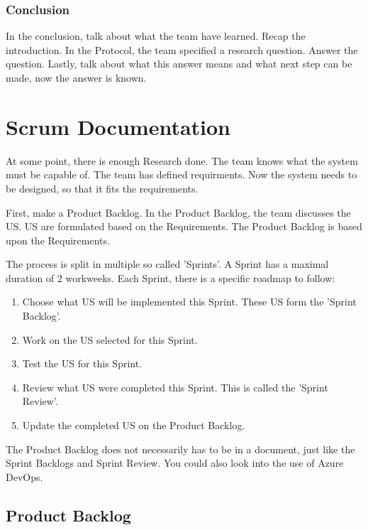 \documentclass[10pt]{report}
\begin{document}
\subsection{Conclusion}

In the conclusion, talk about what the team have learned. Recap the introduction. In the Protocol, the team specified a research question. Answer the question. Lastly, talk about what this answer means and what next step can be made, now the answer is known.

\newpage

\chapter{Scrum Documentation}
\thispagestyle{fancy}

At some point, there is enough Research done. The team knows what the system must be capable of. The team has defined requirments. Now the system needs to be designed, so that it fits the requirements.

\medskip
\minitoc
\medskip

\noindent First, make a Product Backlog. In the Product Backlog, the team discusses the US. US are formulated based on the Requirements. The Product Backlog is based upon the Requirements.

\noindent The process is split in multiple so called 'Sprints'. A Sprint has a maximal duration of 2 workweeks. Each Sprint, there is a specific roadmap to  follow:

\begin{enumerate}
	\item Choose what US will be implemented this Sprint. These US form the 'Sprint Backlog'.
	\item Work on the US selected for this Sprint.
	\item Test the US for this Sprint.
	\item Review what US were completed this Sprint. This is called the 'Sprint Review'.
	\item Update the completed US on the Product Backlog.
\end{enumerate}

\noindent The Product Backlog does not necessarily has to be in a document, just like the Sprint Backlogs and Sprint Review. You could also look into the use of Azure DevOps.

\newpage

\section{Product Backlog}
\end{document}
